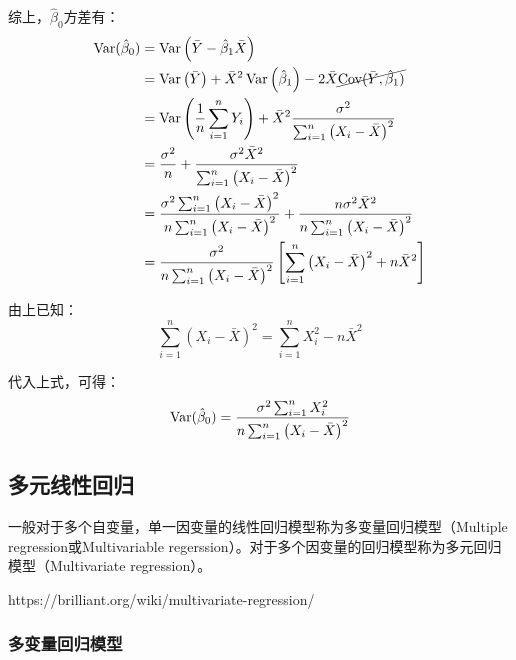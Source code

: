 \documentclass[11pt]{article}
\begin{document}
\begin{property}
    综上，$\hat{\beta}_0$方差有：
    \begin{align*}
        \operatorname{Var}(\hat{\beta}_0) 
        &= \operatorname{Var}\left( \bar{Y} - \hat{\beta}_1 \bar{X} \right) \\
        &= \operatorname{Var} \left(\bar{Y}\right) + \bar{X}^2 \operatorname{Var}\left( \hat{\beta}_1 \right) - 2\bar{X} \cancel{\operatorname{Cov}(\bar{Y},\hat{\beta}_1)} \\
        &= \operatorname{Var}\left( \frac{1}{n} \sum_{i=1}^{n} Y_i \right) + \bar{X}^2 \frac{\sigma^2}{\sum_{i=1}^{n} \left(X_i - \bar{X}\right)^2} \\
        &= \frac{\sigma^2}{n} + \frac{\sigma^2 \bar{X}^2}{\sum_{i=1}^{n} \left(X_i - \bar{X}\right)^2} \\
        &= \frac{\sigma^2 \sum_{i=1}^{n} \left(X_i - \bar{X}\right)^2}{n \sum_{i=1}^{n} \left(X_i - \bar{X}\right)^2}
        + \frac{n \sigma^2 \bar{X}^2}{n \sum_{i=1}^{n} \left(X_i - \bar{X}\right)^2} \\
        &= \frac{\sigma^2}{n \sum_{i=1}^{n} \left(X_i - \bar{X}\right)^2} \left[ \sum_{i=1}^{n} \left(X_i - \bar{X}\right)^2 + n\bar{X}^2 \right]
    \end{align*}

    由上已知：
    \begin{equation*}
        \sum_{i=1}^{n} \left(X_i - \bar{X}\right)^2
        = \sum_{i=1}^{n} X_i^2 - n \bar{X}^2 
    \end{equation*}

    代入上式，可得：
    \begin{equation*}
        \operatorname{Var}(\hat{\beta}_0)
        = \frac{\sigma^2 \sum_{i=1}^{n} X_i^2}{n \sum_{i=1}^{n} \left(X_i - \bar{X}\right)^2}
    \end{equation*}
\end{property}

\subsection{多元线性回归}

一般对于多个自变量，单一因变量的线性回归模型称为多变量回归模型（Multiple regression或Multivariable regerssion）。对于多个因变量的回归模型称为多元回归模型（Multivariate regression）。

https://brilliant.org/wiki/multivariate-regression/

\subsubsection*{多变量回归模型}
\end{document}
